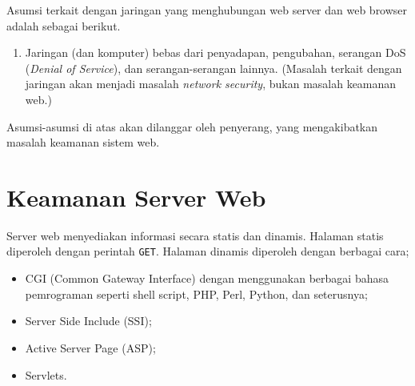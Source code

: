 Asumsi terkait dengan jaringan yang menghubungan web server dan web browser
adalah sebagai berikut.
\begin{enumerate}
   \item Jaringan (dan komputer) bebas dari penyadapan, pengubahan, serangan
      DoS ({\em Denial of Service}), 
      dan serangan-serangan lainnya. (Masalah terkait dengan jaringan akan menjadi
      masalah {\em network security}, bukan masalah keamanan web.)
\end{enumerate}

Asumsi-asumsi di atas akan dilanggar oleh penyerang, yang mengakibatkan masalah
keamanan sistem web.


\section{Keamanan Server Web}
Server web menyediakan informasi secara statis dan dinamis. Halaman statis
diperoleh dengan perintah {\tt GET}. Halaman dinamis diperoleh dengan berbagai
cara;
\begin{itemize}
   \item CGI (Common Gateway Interface) dengan menggunakan berbagai bahasa
      pemrograman seperti shell script, PHP, Perl, Python, dan seterusnya;
   \item Server Side Include (SSI);
   \item Active Server Page (ASP);
   \item Servlets.
\end{itemize}
